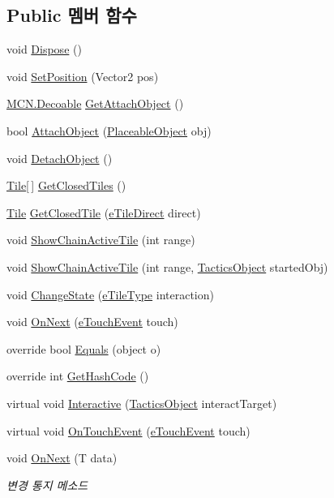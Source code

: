 \subsection*{Public 멤버 함수}
\begin{DoxyCompactItemize}
\item 
void \hyperlink{class_tile_a6e8a801e95a29156cbf32024e45c6596}{Dispose} ()
\item 
void \hyperlink{class_tile_a4d7a81b36513066aad741ed675164690}{Set\+Position} (Vector2 pos)
\item 
\hyperlink{class_m_c_n_1_1_decoable}{M\+C\+N.\+Decoable} \hyperlink{class_tile_a6c6758ca210a37d98f8e73e87c65f1d2}{Get\+Attach\+Object} ()
\item 
bool \hyperlink{class_tile_a1969ee41c320c6e7748a33374942e07e}{Attach\+Object} (\hyperlink{class_placeable_object}{Placeable\+Object} obj)
\item 
void \hyperlink{class_tile_ab8ab187ab674cfb222f761feac3b20b3}{Detach\+Object} ()
\item 
\hyperlink{class_tile}{Tile}\mbox{[}$\,$\mbox{]} \hyperlink{class_tile_a38b9f5c215f16448118e83e0d10aed05}{Get\+Closed\+Tiles} ()
\item 
\hyperlink{class_tile}{Tile} \hyperlink{class_tile_a838aaa6a94321629d04e944ed3bf8b9f}{Get\+Closed\+Tile} (\hyperlink{_tile_8cs_a082f743a62d2d8e13dac8fd38af246d7}{e\+Tile\+Direct} direct)
\item 
void \hyperlink{class_tile_a0ca6f4d1ddb0e7609749f1cf583b3c16}{Show\+Chain\+Active\+Tile} (int range)
\item 
void \hyperlink{class_tile_a6172e6a33d37d2992a1b0b6f5c2ed117}{Show\+Chain\+Active\+Tile} (int range, \hyperlink{class_tactics_object}{Tactics\+Object} started\+Obj)
\item 
void \hyperlink{class_tile_a2bb5c747e9483b803ea65b4341ce5af6}{Change\+State} (\hyperlink{_tile_8cs_a271bc07be325bca511bcb747e0ff2fda}{e\+Tile\+Type} interaction)
\item 
void \hyperlink{class_tile_a6133171796d47353aa5d57cd336e0a07}{On\+Next} (\hyperlink{_touch_manager_8cs_ae33e321a424fe84ba8b2fdb81ad40a68}{e\+Touch\+Event} touch)
\item 
override bool \hyperlink{class_tactics_object_aa445b127fafc61d84a064b423a155c1a}{Equals} (object o)
\item 
override int \hyperlink{class_tactics_object_a5fe0e8c99cec56daa7909754f037ac26}{Get\+Hash\+Code} ()
\item 
virtual void \hyperlink{class_tactics_object_a5f94ed01497a7072a2785163f4cbc57b}{Interactive} (\hyperlink{class_tactics_object}{Tactics\+Object} interact\+Target)
\item 
virtual void \hyperlink{class_tactics_object_a0353d47981c71db7fe32bd414f025e9b}{On\+Touch\+Event} (\hyperlink{_touch_manager_8cs_ae33e321a424fe84ba8b2fdb81ad40a68}{e\+Touch\+Event} touch)
\item 
void \hyperlink{interface_m_c_n_1_1_i_observer_a2f934b71aa4ddf6f936670d32c3cdff7}{On\+Next} (T data)
\begin{DoxyCompactList}\small\item\em 변경 통지 메소드 \end{DoxyCompactList}\end{DoxyCompactItemize}
